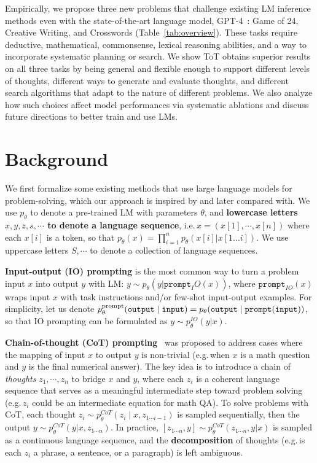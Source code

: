Empirically, we propose three new problems that challenge existing LM inference methods even with the state-of-the-art language model, GPT-4~\cite{OpenAI2023GPT4TR}: Game of 24, Creative Writing, and Crosswords (Table~\ref{tab:overview}). 
These tasks require deductive, mathematical, commonsense, lexical reasoning abilities, and a way to incorporate systematic planning or search. We show ToT obtains superior results on all three tasks by being general and flexible enough to support different levels of thoughts, different ways to generate and evaluate thoughts, and different search algorithms that adapt to the nature of different problems. We also analyze how such choices affect model performances via systematic ablations and discuss future directions to better train and use LMs.

\section{Background}

We first formalize some existing methods that use large language models for problem-solving, which our approach is inspired by and later compared with. We use $p_\theta$ to denote a pre-trained LM with parameters $\theta$, and \textbf{lowercase letters $x,y,z,s,\cdots$ to denote a language {sequence}}, i.e.\,$x=(x[1], \cdots, x[n])$ where each $x[i]$ is a token, so that $p_\theta(x) = \prod_{i=1}^{n} p_\theta(x[i] | x[1...i])$. We use uppercase letters $S, \cdots$ to denote a collection of language sequences. 

\textbf{Input-output (IO) prompting} is the most common way to turn a problem input $x$ into output $y$ with LM: $y \sim p_\theta(y | \texttt{prompt}_IO(x))$, where $\texttt{prompt}_{IO}(x)$ wraps input $x$ with task instructions and/or few-shot input-output examples. For simplicity, let us denote $p_\theta^{{\rm prompt}}(\texttt{output} \mid \texttt{input}) = p_\theta(\texttt{output} \mid \texttt{prompt}(\texttt{input}))$, so that IO prompting can be formulated as $y \sim p_\theta^{IO}(y|x)$. 

\textbf{Chain-of-thought (CoT) prompting}~\citep{wei2022chain} was proposed to address cases where the mapping of input $x$ to output $y$ is  non-trivial (e.g.\,when $x$ is a math question and $y$ is the final numerical answer). The key idea is to introduce a chain of {\em thoughts} $z_1, \cdots, z_n$ to bridge $x$ and $y$, where each $z_i$ is a coherent language sequence that serves as a meaningful intermediate step toward problem solving (e.g.\,$z_i$ could be an intermediate equation for math QA). To solve problems with CoT, each thought $z_i \sim p_\theta^{CoT}(z_i \mid x, z_{1\cdots i-1})$ is sampled sequentially, then the output $y \sim p_\theta^{CoT}(y | x, z_{1 \cdots n})$. In practice, $[z_{1\cdots n}, y] \sim p_\theta^{CoT}(z_{1\cdots n}, y | x)$ is sampled as a continuous language sequence, and the \textbf{decomposition} of thoughts (e.g.\,is each $z_i$ a phrase, a sentence, or a paragraph) is left ambiguous.

